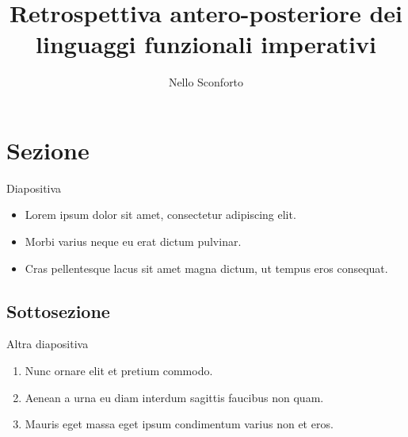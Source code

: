 \documentclass[beamer={noamsthm,10pt},target=mst]{thud}[2014/03/11]
\title{Retrospettiva antero-posteriore dei linguaggi funzionali imperativi}
\author{Nello Sconforto}
\begin{document}
\maketitle

\section{Sezione}

\begin{frame}{Diapositiva}
\begin{itemize}
\item Lorem ipsum dolor sit amet, consectetur adipiscing elit.
\item Morbi varius neque eu erat dictum pulvinar.
\item Cras pellentesque lacus sit amet magna dictum, ut tempus eros consequat.
\end{itemize}
\end{frame}

\subsection{Sottosezione}
\begin{frame}{Altra diapositiva}
\begin{enumerate}
\item Nunc ornare elit et pretium commodo.
\item Aenean a urna eu diam interdum sagittis faucibus non quam.
\item Mauris eget massa eget ipsum condimentum varius non et eros.
\end{enumerate}
\end{frame}
\end{document}
